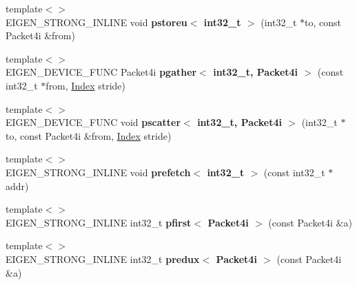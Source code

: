 \begin{DoxyCompactItemize}
{\footnotesize template$<$$>$ }\\E\+I\+G\+E\+N\+\_\+\+S\+T\+R\+O\+N\+G\+\_\+\+I\+N\+L\+I\+NE void {\bfseries pstoreu$<$ int32\+\_\+t $>$} (int32\+\_\+t $\ast$to, const Packet4i \&from)
\item 
\mbox{\label{namespace_eigen_1_1internal_ae274a0bcf835500d0dc6bda5665bdc0e}} 
{\footnotesize template$<$$>$ }\\E\+I\+G\+E\+N\+\_\+\+D\+E\+V\+I\+C\+E\+\_\+\+F\+U\+NC Packet4i {\bfseries pgather$<$ int32\+\_\+t, Packet4i $>$} (const int32\+\_\+t $\ast$from, \hyperlink{namespace_eigen_a62e77e0933482dafde8fe197d9a2cfde}{Index} stride)
\item 
\mbox{\label{namespace_eigen_1_1internal_afe1191d383ca7e81914af262daa88556}} 
{\footnotesize template$<$$>$ }\\E\+I\+G\+E\+N\+\_\+\+D\+E\+V\+I\+C\+E\+\_\+\+F\+U\+NC void {\bfseries pscatter$<$ int32\+\_\+t, Packet4i $>$} (int32\+\_\+t $\ast$to, const Packet4i \&from, \hyperlink{namespace_eigen_a62e77e0933482dafde8fe197d9a2cfde}{Index} stride)
\item 
\mbox{\label{namespace_eigen_1_1internal_a50a3f5dae9be6520b25ceb0f4d7782e5}} 
{\footnotesize template$<$$>$ }\\E\+I\+G\+E\+N\+\_\+\+S\+T\+R\+O\+N\+G\+\_\+\+I\+N\+L\+I\+NE void {\bfseries prefetch$<$ int32\+\_\+t $>$} (const int32\+\_\+t $\ast$addr)
\item 
\mbox{\label{namespace_eigen_1_1internal_afd854fc639e98a94afaf67e6e235fc6b}} 
{\footnotesize template$<$$>$ }\\E\+I\+G\+E\+N\+\_\+\+S\+T\+R\+O\+N\+G\+\_\+\+I\+N\+L\+I\+NE int32\+\_\+t {\bfseries pfirst$<$ Packet4i $>$} (const Packet4i \&a)
\item 
\mbox{\label{namespace_eigen_1_1internal_abb52d0d80d9b9232f302c3fd0598c01d}} 
{\footnotesize template$<$$>$ }\\E\+I\+G\+E\+N\+\_\+\+S\+T\+R\+O\+N\+G\+\_\+\+I\+N\+L\+I\+NE int32\+\_\+t {\bfseries predux$<$ Packet4i $>$} (const Packet4i \&a)
\item 
\mbox{\label{namespace_eigen_1_1internal_aa22e643e907af7473ef949d76ce1f88e}} 

\end{DoxyCompactItemize}
